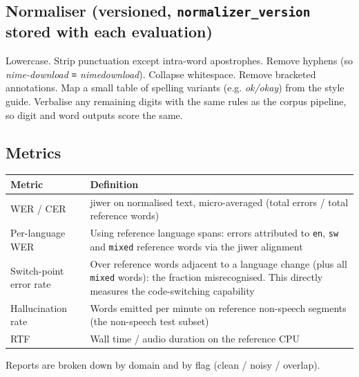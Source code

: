 \documentclass[11pt]{article}
\begin{document}
\hypertarget{normaliser-versioned-normalizer_version-stored-with-each-evaluation}{%
\subsection{\texorpdfstring{Normaliser (versioned, \texttt{normalizer\_version} stored with each evaluation)}{Normaliser (versioned, normalizer\_version stored with each evaluation)}}\label{normaliser-versioned-normalizer_version-stored-with-each-evaluation}}

Lowercase. Strip punctuation except intra-word apostrophes. Remove hyphens (so \emph{nime-download} ≡ \emph{nimedownload}). Collapse whitespace. Remove bracketed annotations. Map a small table of spelling variants (e.g. \emph{ok/okay}) from the style guide. Verbalise any remaining digits with the same rules as the corpus pipeline, so digit and word outputs score the same.

\hypertarget{metrics}{%
\subsection{Metrics}\label{metrics}}

\begin{longtable}[]{@{}>{\raggedright\arraybackslash}p{}>{\raggedright\arraybackslash}p{}@{}}
\toprule\noalign{}
Metric & Definition \\
\midrule\noalign{}
\endhead
\bottomrule\noalign{}
\endlastfoot
WER / CER & jiwer on normalised text, micro-averaged (total errors / total reference words) \\
Per-language WER & Using reference language spans: errors attributed to \texttt{en}, \texttt{sw} and \texttt{mixed} reference words via the jiwer alignment \\
Switch-point error rate & Over reference words adjacent to a language change (plus all \texttt{mixed} words): the fraction misrecognised. This directly measures the code-switching capability \\
Hallucination rate & Words emitted per minute on reference non-speech segments (the non-speech test subset) \\
RTF & Wall time / audio duration on the reference CPU \\
\end{longtable}

Reports are broken down by domain and by flag (clean / noisy / overlap).
\end{document}
